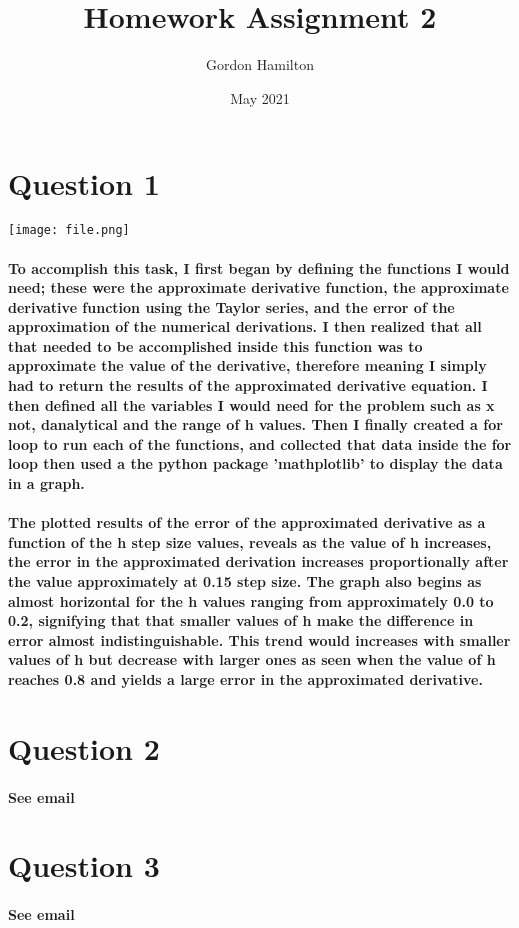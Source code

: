 \documentclass{article}
\title{Homework Assignment 2}
\author{Gordon Hamilton}
\date{May 2021}
\begin{document}
\maketitle

\section{Question 1}

\texttt{[image: file.png]}

\paragraph{To accomplish this task, I first began by defining the functions I would need; these were the approximate derivative function, the approximate derivative function using the Taylor series, and the error of the approximation of the numerical derivations. I then realized that all that needed to be accomplished inside this function was to approximate the value of the derivative, therefore meaning I simply had to return the results of the approximated derivative equation. I then defined all the variables I would need for the problem such as x not, d\textunderscore analytical and the range of h values. Then I finally created a for loop to run each of the functions, and collected that data inside the for loop then used a the python package 'mathplotlib' to display the data in a graph.}

\paragraph{The plotted results of the error of the approximated derivative as a function of the h step size values, reveals as the value of h increases, the error in the approximated derivation increases proportionally after the value approximately at 0.15 step size. The graph also begins as almost horizontal for the h values ranging from approximately 0.0 to 0.2, signifying that that smaller values of h make the difference in error almost indistinguishable.  This trend would increases with smaller values of h but decrease with larger ones as seen when the value of h reaches 0.8 and yields a large error in the approximated derivative.}

   

\section{Question 2}

\paragraph{See email}

\section{Question 3}

\paragraph{See email}
\end{document}
